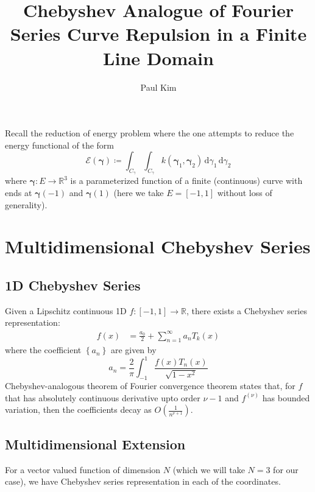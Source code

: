 \documentclass[a4paper]{article}
\title{Chebyshev Analogue of Fourier Series Curve Repulsion in a Finite Line Domain}
\author{Paul Kim}
\newcommand{\dgamma}{\, \text{d} \gamma}
\newcommand{\gammabf}{\boldsymbol{\gamma}}
\begin{document}
\maketitle

Recall the reduction of energy problem where the one attempts to reduce the energy functional of the form
\begin{equation}
    \mathcal{E} (\gammabf) \coloneqq \int_{C_\gamma} \int_{C_\gamma} k\left( \gammabf_1, \gammabf_2 \right) \dgamma_1 \dgamma_2
\end{equation}
where $\gammabf: E \rightarrow \mathbb{R}^3$ is a parameterized function of a finite (continuous) curve with ends at $\gammabf(-1)$ and $\gammabf(1)$ (here we take $E = \left[ -1,1 \right]$ without loss of generality).

\section{Multidimensional Chebyshev Series}
\subsection{1D Chebyshev Series}
Given a Lipschitz continuous 1D $f:\left[ -1,1 \right] \rightarrow \mathbb{R}$, there exists a Chebyshev series representation:
\begin{align}
    f(x) &= \frac{a_0}{2} + \sum_{n = 1}^{\infty} a_n T_k(x)
\end{align}
where the coefficient $\left\{ a_n \right\}$ are given by
\begin{equation}
    a_n = \frac{2}{\pi} \int_{-1}^{1} \frac{f(x) T_n(x)}{\sqrt{1-x^2}}
\end{equation}
Chebyshev-analogous theorem of Fourier convergence theorem states that, for $f$ that has absolutely continuous derivative upto order $\nu - 1$ and $f^{(\nu)}$ has bounded variation, then the coefficients decay as $O\left( \frac{1}{n^{\nu + 1}} \right)$.

\subsection{Multidimensional Extension}
For a vector valued function of dimension $N$ (which we will take $N=3$ for our case), we have Chebyshev series representation in each of the coordinates.
\end{document}
